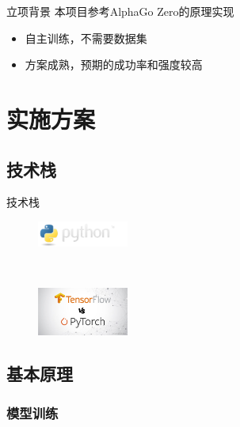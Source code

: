 \documentclass[compress]{beamer}
\begin{document}
\begin{frame}{立项背景}
  本项目参考AlphaGo Zero的原理实现
  \pause
  \begin{itemize}
    \item 自主训练，不需要数据集
          \pause
    \item 方案成熟，预期的成功率和强度较高
  \end{itemize}
\end{frame}

\section{实施方案}

\subsection{技术栈}

\begin{frame}{技术栈}
  \begin{figure}[htbp]
    \centering
    \begin{minipage}[t]{0.4\textwidth}
      \centering
      \includegraphics[width=3cm]{python-logo.png}
    \end{minipage}
    \\[5mm]
    \begin{minipage}[t]{0.4\textwidth}
      \centering
      \includegraphics[width=3cm]{d7f4837cf8284e08838d13669f8eb738.png}
    \end{minipage}
  \end{figure}
\end{frame}

\subsection{基本原理}

\subsubsection{模型训练}
\end{document}
